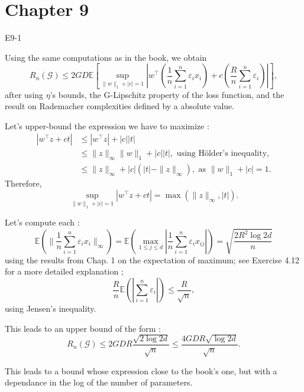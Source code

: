 \section{Chapter 9}
\begin{questions}

    \question E9-1

    \begin{solution}
        Using the same computations as in the book, we obtain
        $$R_n(\mathcal{G}) \leq 2GD \mathbb{E} \left[ \sup_{\|w\|_1 + |c| = 1}{ \left| w^\top \left( \frac{1}{n} \sum_{i=1}^{n} \varepsilon_i x_i \right) + c \left( \frac{R}{n} \sum_{i=1}^{n} \varepsilon_i \right) \right|}  \right],
        $$
        after using $\eta$'s bounds, the G-Lipschitz property of the loss function, and the result on Rademacher complexities defined by a absolute value.

        Let's upper-bound the expression we have to maximize :
        $$
        \begin{aligned}
            |w^\top z +c t| &\leq |w^\top z| + |c| |t| \\
            &\leq \|z\|_\infty \|w\|_1 + |c| |t|, \text{ using Hölder's inequality,} \\
            &\leq \|z\|_\infty + |c| (|t| - \|z\|_\infty), \text{ as } \|w\|_1 + |c| = 1.
        \end{aligned}
        $$
        Therefore,
        $$
        \sup_{\|w\|_1 + |c| = 1}{ \left| w^\top z + c t \right| } = \max \left( \|z\|_\infty, |t| \right).
        $$

        Let's compute each :
        $$
        \mathbb{E} (\| \frac{1}{n} \sum_{i=1}^{n} \varepsilon_i x_i \|_\infty ) = \mathbb{E} ( \max_{1 \leq j \leq d} | \frac{1}{n} \sum_{i=1}^{n} \varepsilon_i x_{ij} |) = \sqrt{\frac{2 R^2 \log 2d}{n}}
        $$ using the results from Chap. 1 on the expectation of maximum; see Exercise 4.12 for a more detailed explanation ;
        $$
        \frac{R}{n} \mathbb{E} (| \sum_{i=1}^{n} \varepsilon_i |) \leq \frac{R}{ \sqrt{n}},
        $$
        using Jensen's inequality.

        This leads to an upper bound of the form : $$R_n(\mathcal{G}) \leq 2GDR \frac{\sqrt{2 \log 2d}}{\sqrt{n}} \leq \frac{4 GDR \sqrt{\log 2d}}{\sqrt{n}}.$$

        This leads to a bound whose expression close to the book's one, but with a dependance in the log of the number of parameters.
    \end{solution}
\end{questions}
